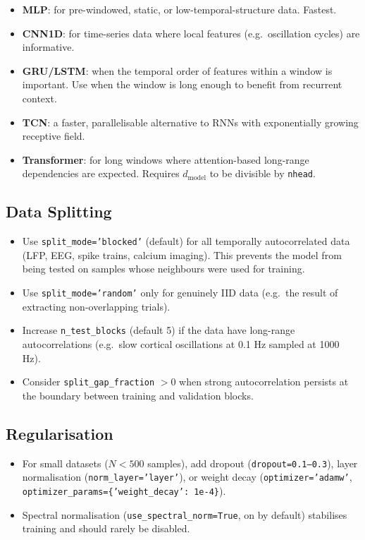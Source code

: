 \documentclass[12pt]{article}
\newcommand{\api}[1]{\texttt{#1}}
\begin{document}
\begin{itemize}[leftmargin=*]
  \item \textbf{MLP}: for pre-windowed, static, or low-temporal-structure
        data.  Fastest.
  \item \textbf{CNN1D}: for time-series data where local features (e.g.\
        oscillation cycles) are informative.
  \item \textbf{GRU/LSTM}: when the temporal order of features within a
        window is important.  Use when the window is long enough to benefit
        from recurrent context.
  \item \textbf{TCN}: a faster, parallelisable alternative to RNNs with
        exponentially growing receptive field.
  \item \textbf{Transformer}: for long windows where attention-based
        long-range dependencies are expected.  Requires $d_{\mathrm{model}}$
        to be divisible by \api{nhead}.
\end{itemize}

\subsection{Data Splitting}

\begin{itemize}[leftmargin=*]
  \item Use \api{split\_mode='blocked'} (default) for all temporally
        autocorrelated data (LFP, EEG, spike trains, calcium imaging).
        This prevents the model from being tested on samples whose
        neighbours were used for training.
  \item Use \api{split\_mode='random'} only for genuinely IID data (e.g.\
        the result of extracting non-overlapping trials).
  \item Increase \api{n\_test\_blocks} (default 5) if the data have
        long-range autocorrelations (e.g.\ slow cortical oscillations at
        0.1 Hz sampled at 1000 Hz).
  \item Consider \api{split\_gap\_fraction} $> 0$ when strong
        autocorrelation persists at the boundary between training and
        validation blocks.
\end{itemize}

\subsection{Regularisation}

\begin{itemize}[leftmargin=*]
  \item For small datasets ($N < 500$ samples), add dropout
        (\api{dropout=0.1--0.3}), layer normalisation
        (\api{norm\_layer='layer'}), or weight decay
        (\api{optimizer='adamw'}, \api{optimizer\_params=\{'weight\_decay': 1e-4\}}).
  \item Spectral normalisation (\api{use\_spectral\_norm=True}, on by
        default) stabilises training and should rarely be disabled.
\end{itemize}
\end{document}
